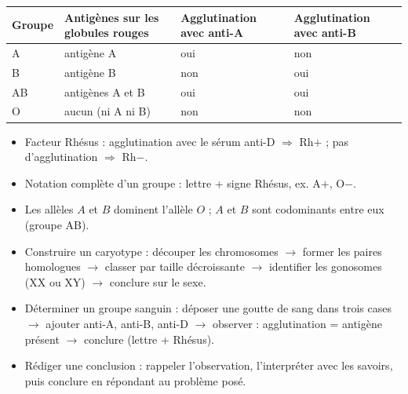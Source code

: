 \documentclass[11pt]{article}
\newcommand{\cle}[1]{{\popxbold\color{popdark}#1}}
\begin{document}
\begin{aretenir}
\begin{center}
\begin{tabularx}{\linewidth}{|l|X|X|X|}
\hline
\rowcolor{popblueL} \textbf{Groupe} & \textbf{Antigènes sur les globules rouges} & \textbf{Agglutination avec anti-A} & \textbf{Agglutination avec anti-B} \\
\hline
A & antigène A & oui & non \\
\hline
B & antigène B & non & oui \\
\hline
AB & antigènes A et B & oui & oui \\
\hline
O & aucun (ni A ni B) & non & non \\
\hline
\end{tabularx}
\end{center}
\begin{itemize}
  \item Facteur Rhésus : agglutination avec le sérum \cle{anti-D} $\Rightarrow$ Rh$+$ ; pas d'agglutination $\Rightarrow$ Rh$-$.
  \item Notation complète d'un groupe : lettre + signe Rhésus, ex. A$+$, O$-$.
  \item Les allèles $A$ et $B$ dominent l'allèle $O$ ; $A$ et $B$ sont codominants entre eux (groupe AB).
\end{itemize}
\end{aretenir}

\begin{methode}
\begin{itemize}
  \item \cle{Construire un caryotype} : découper les chromosomes $\rightarrow$ former les paires homologues $\rightarrow$ classer par taille décroissante $\rightarrow$ identifier les gonosomes (XX ou XY) $\rightarrow$ conclure sur le sexe.
  \item \cle{Déterminer un groupe sanguin} : déposer une goutte de sang dans trois cases $\rightarrow$ ajouter anti-A, anti-B, anti-D $\rightarrow$ observer : agglutination = antigène présent $\rightarrow$ conclure (lettre + Rhésus).
  \item \cle{Rédiger une conclusion} : rappeler l'observation, l'interpréter avec les savoirs, puis conclure en répondant au problème posé.
\end{itemize}
\end{methode}
\end{document}
